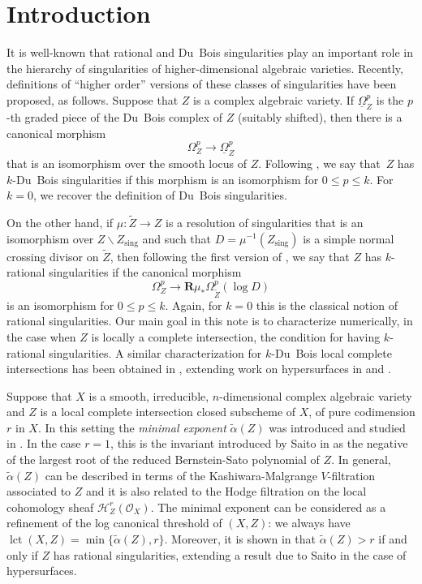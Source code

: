 \documentclass[11pt]{article}
\numberwithin{equation}{section}
\theoremstyle{plain}
\theoremstyle{definition}
\newcommand\cH{\mathcal{H}}
\newcommand\cO{\mathcal{O}}
\newcommand\cH{\mathcal{H}}
\newcommand\cO{\mathcal{O}}
\newcommand\sing{\mathrm{sing}}
\DeclareMathOperator{\lct}{lct}
\begin{document}
\section{Introduction}

It is well-known that rational and Du~Bois singularities play an important role in the hierarchy of singularities of higher-dimensional algebraic varieties.
Recently, definitions of ``higher order'' versions of these classes of singularities have been proposed, as follows. Suppose that $Z$ is a complex algebraic variety.
If $\underline{\Omega}_Z^p$ is the $p$-th graded piece of the Du~Bois complex of $Z$ (suitably shifted), then there is a canonical morphism
\[\Omega_Z^p\to\underline{\Omega}_Z^p\]
that is an isomorphism over the smooth locus of $Z$. Following \cite{Saito_et_al}, we say that~$Z$ has $k$-Du~Bois singularities if this morphism is an isomorphism
for $0\leq p\leq k$. For $k=0$, we recover the definition of Du~Bois singularities.

On the other hand, if $\mu\colon\widetilde{Z}\to Z$ is a resolution of singularities that is an isomorphism over $Z\smallsetminus Z_\sing$
and such that $D=\mu^{-1}(Z_\sing)$ is a simple normal crossing divisor on $\widetilde{Z}$, then following the first version of \cite{FL1}, we say that $Z$ has
$k$-rational singularities if the canonical morphism
\[\Omega_Z^p\to {\mathbf R}\mu_*\Omega_{\widetilde{Z}}^p(\log D)\]
is an isomorphism for $0\leq p\leq k$. Again, for $k=0$ this is the classical notion of rational singularities.
Our main goal in this note is to characterize numerically, in the case when $Z$ is locally a complete intersection, the condition for having $k$-rational singularities.
A similar characterization for $k$-Du~Bois local complete intersections has been obtained in \cite{MP1}, extending work on hypersurfaces in \cite{MOPW}
and \cite{Saito_et_al}.

Suppose that $X$ is a smooth, irreducible, $n$-dimensional complex algebraic variety and $Z$ is a local complete intersection closed subscheme of $X$,
of pure codimension $r$ in $X$. In this setting the \emph{minimal exponent} $\widetilde{\alpha}(Z)$ was introduced and studied in \cite{CDMO}. In the case
$r=1$, this is the invariant introduced by Saito in \cite{Saito_microlocal} as the negative of the largest root of the reduced Bernstein-Sato polynomial of $Z$.
In general, $\widetilde{\alpha}(Z)$ can be described in terms of the Kashiwara-Malgrange $V$-filtration associated to $Z$ and it is also related to the Hodge filtration on the
local cohomology sheaf $\cH_Z^r(\cO_X)$. The minimal exponent can be considered as a refinement of the log canonical threshold of $(X,Z)$: we always have
$\lct(X,Z)=\min\big\{\widetilde{\alpha}(Z),r\}$. Moreover, it is shown in \cite{CDMO} that $\widetilde{\alpha}(Z)>r$ if and only if $Z$ has rational singularities,
extending a result due to Saito \cite{Saito-B} in the case of hypersurfaces.
\end{document}
